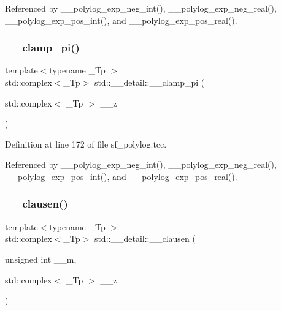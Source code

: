 Referenced by \+\_\+\+\_\+polylog\+\_\+exp\+\_\+neg\+\_\+int(), \+\_\+\+\_\+polylog\+\_\+exp\+\_\+neg\+\_\+real(), \+\_\+\+\_\+polylog\+\_\+exp\+\_\+pos\+\_\+int(), and \+\_\+\+\_\+polylog\+\_\+exp\+\_\+pos\+\_\+real().

\mbox{\label{namespacestd_1_1____detail_aa341299d514aa754403a775b9ed51c91}} 
\subsubsection{\texorpdfstring{\+\_\+\+\_\+clamp\+\_\+pi()}{\_\_clamp\_pi()}}
{\footnotesize\ttfamily template$<$typename \+\_\+\+Tp $>$ \\
std\+::complex$<$\+\_\+\+Tp$>$ std\+::\+\_\+\+\_\+detail\+::\+\_\+\+\_\+clamp\+\_\+pi (\begin{DoxyParamCaption}\item[{std\+::complex$<$ \+\_\+\+Tp $>$}]{\+\_\+\+\_\+z }\end{DoxyParamCaption})}



Definition at line 172 of file sf\+\_\+polylog.\+tcc.



Referenced by \+\_\+\+\_\+polylog\+\_\+exp\+\_\+neg\+\_\+int(), \+\_\+\+\_\+polylog\+\_\+exp\+\_\+neg\+\_\+real(), \+\_\+\+\_\+polylog\+\_\+exp\+\_\+pos\+\_\+int(), and \+\_\+\+\_\+polylog\+\_\+exp\+\_\+pos\+\_\+real().

\mbox{\label{namespacestd_1_1____detail_a8f7e931e2a93b8d298a4df702a5e41ad}} 
\subsubsection{\texorpdfstring{\+\_\+\+\_\+clausen()}{\_\_clausen()}\hspace{0.1cm}{\footnotesize\ttfamily [1/2]}}
{\footnotesize\ttfamily template$<$typename \+\_\+\+Tp $>$ \\
std\+::complex$<$\+\_\+\+Tp$>$ std\+::\+\_\+\+\_\+detail\+::\+\_\+\+\_\+clausen (\begin{DoxyParamCaption}\item[{unsigned int}]{\+\_\+\+\_\+m,  }\item[{std\+::complex$<$ \+\_\+\+Tp $>$}]{\+\_\+\+\_\+z }\end{DoxyParamCaption})}


